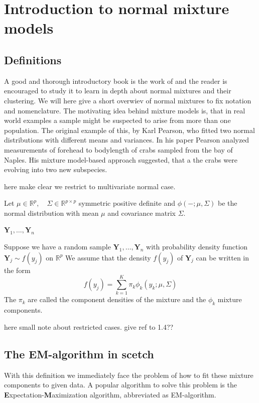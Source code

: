 \chapter{Introduction to normal mixture models}


\section{Definitions}

A good and thorough introductory book is the work of \cite{McL00} and
the reader is encouraged to study it to learn in depth about normal mixtures
and their clustering. 
We will here give a short overwiev of normal mixtures to fix notation and 
nomenclature.
The motivating idea behind mixture models is, that in real world examples
a sample might be suspected to arise from more than one population.
The original example of this, by Karl Pearson, who fitted two normal 
distributions with different means and variances.
In his paper Pearson analyzed measurements of forehead to bodylength of crabs
sampled from the bay of Naples. His mixture model-based approach suggested, 
that a the crabs were evolving into two new subspecies.

here make clear we restrict to multivariate normal case.

Let $ \mu \in \mathbb{R}^p , \quad \Sigma \in \mathbb{R}^{p \times p} $ 
symmetric positive definite and $ \phi(- ; \mu, \Sigma) $ be the normal 
distribution with mean $ \mu $ and covariance matrix $ \Sigma $.


$ \pmb{Y}_1, \dots , \pmb{Y}_n $

\begin{definition}
    Suppose we have a random sample $ \pmb{Y}_1, \dots , \pmb{Y}_n $ with 
    probability density function $ \pmb{Y}_j \sim f(y_j) $ on 
    $\mathbb{R}^p$ We assume that the density $ f(y_j) $ of $ \pmb{Y}_j $ can 
    be written in the form 
    \[ f(y_j) = \sum_{k=1}^{K} \pi_k \phi_k (y_k; \mu, \Sigma) \]
    The $ \pi_k $ are called the component densities of the mixture and the 
    $\phi_k$ mixture components.
\end{definition}

here small note about restricted cases. give ref to 1.4??

\section{The EM-algorithm in scetch}

With this definition we immediately face the problem of how to fit these
mixture components to given data. A popular algorithm to solve this problem 
is the {\bf E}xpectation-{\bf M}aximization algorithm, abbreviated as 
EM-algorithm.

